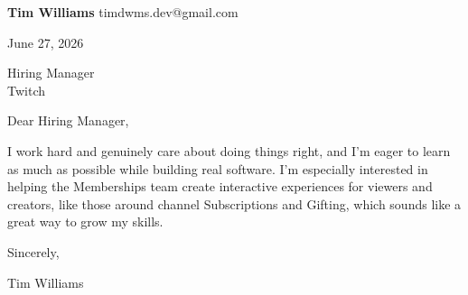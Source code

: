 \documentclass[12pt]{article}
\begin{document}
\textbf{Tim Williams} \hfill timdwms.dev@gmail.com

\vspace{1em}

June 27, 2026

\vspace{1em}

Hiring Manager \\
Twitch

\vspace{1em}

Dear Hiring Manager,

I work hard and genuinely care about doing things right, and I'm eager to learn as much as possible while building real software. I'm especially interested in helping the Memberships team create interactive experiences for viewers and creators, like those around channel Subscriptions and Gifting, which sounds like a great way to grow my skills.

\vspace{1em}

Sincerely,

\vspace{2em}

Tim Williams
\end{document}
